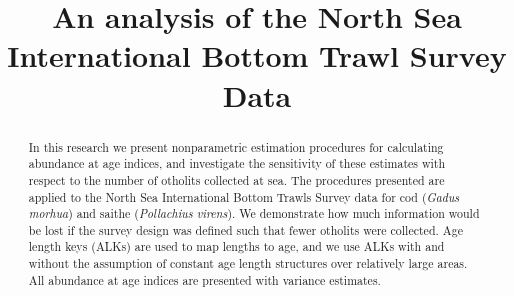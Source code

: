 \documentclass[a4paper 12pt]{article}
\title{\bf 
}
\author{}
\date{}
\numberwithin{equation}{section}
\begin{document}


\title{An analysis of the North Sea International Bottom Trawl Survey Data}

\maketitle


\begin{abstract}

In this research we present nonparametric estimation procedures for calculating abundance at age indices, and investigate the sensitivity of these estimates with respect to the number of otholits collected at sea. The procedures presented are applied to the North Sea International Bottom Trawls Survey data for cod (\textit{Gadus morhua}) and saithe (\textit{Pollachius virens}). We demonstrate how much information would be lost if the survey design was defined such that fewer otholits were collected. Age length keys (ALKs) are used to map lengths to age, and we use ALKs with and without the assumption of constant age length structures over relatively large areas. All abundance at age indices are presented with variance estimates. \\

\end{abstract}
\end{document}

